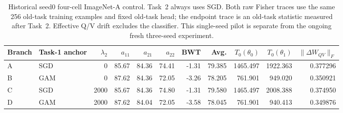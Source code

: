 \begin{table}[t]
\centering
\caption{Historical seed0 four-cell ImageNet-A control. Task~2 always uses SGD. Both raw Fisher traces use the same 256 old-task training examples and fixed old-task head; the endpoint trace is an old-task statistic measured after Task~2. Effective Q/V drift excludes the classifier. This single-seed pilot is separate from the ongoing fresh three-seed experiment.}
\label{tab:rq2_pilot_complete}
\scriptsize
\begin{tabular}{llrrrrrrrrr}
\toprule
Branch & Task-1 anchor & $\lambda_2$ & $a_{11}$ & $a_{21}$ & $a_{22}$ & BWT & Avg. & $T_0(\theta_0)$ & $T_0(\theta_1)$ & $\|\Delta W_{QV}\|_F$ \\
\midrule
A & SGD & 0 & 85.67 & 84.36 & 74.41 & -1.31 & 79.385 & 1465.497 & 1922.363 & 0.377296 \\
B & GAM & 0 & 87.62 & 84.36 & 72.05 & -3.26 & 78.205 & 761.901 & 949.020 & 0.350921 \\
C & SGD & 2000 & 85.67 & 84.36 & 74.80 & -1.31 & 79.580 & 1465.497 & 2008.388 & 0.374950 \\
D & GAM & 2000 & 87.62 & 84.04 & 72.05 & -3.58 & 78.045 & 761.901 & 940.413 & 0.349876 \\
\bottomrule
\end{tabular}
\end{table}
